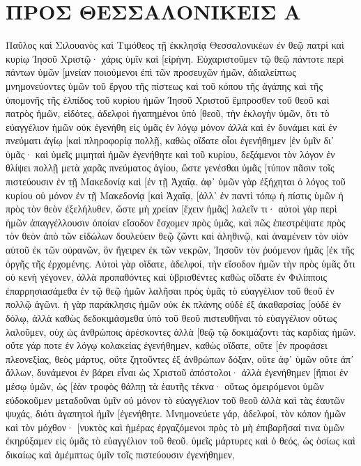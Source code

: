 \section{ΠΡΟΣ ΘΕΣΣΑΛΟΝΙΚΕΙΣ Α}
Παῦλος καὶ Σιλουανὸς καὶ Τιμόθεος τῇ ἐκκλησίᾳ Θεσσαλονικέων ἐν θεῷ πατρὶ καὶ κυρίῳ Ἰησοῦ Χριστῷ· χάρις ὑμῖν καὶ [εἰρήνη. 
Εὐχαριστοῦμεν τῷ θεῷ πάντοτε περὶ πάντων ὑμῶν [μνείαν ποιούμενοι ἐπὶ τῶν προσευχῶν ἡμῶν, ἀδιαλείπτως 
μνημονεύοντες ὑμῶν τοῦ ἔργου τῆς πίστεως καὶ τοῦ κόπου τῆς ἀγάπης καὶ τῆς ὑπομονῆς τῆς ἐλπίδος τοῦ κυρίου ἡμῶν Ἰησοῦ Χριστοῦ ἔμπροσθεν τοῦ θεοῦ καὶ πατρὸς ἡμῶν, 
εἰδότες, ἀδελφοὶ ἠγαπημένοι ὑπὸ [θεοῦ, τὴν ἐκλογὴν ὑμῶν, 
ὅτι τὸ εὐαγγέλιον ἡμῶν οὐκ ἐγενήθη εἰς ὑμᾶς ἐν λόγῳ μόνον ἀλλὰ καὶ ἐν δυνάμει καὶ ἐν πνεύματι ἁγίῳ [καὶ πληροφορίᾳ πολλῇ, καθὼς οἴδατε οἷοι ἐγενήθημεν [ἐν ὑμῖν δι᾽ ὑμᾶς· 
καὶ ὑμεῖς μιμηταὶ ἡμῶν ἐγενήθητε καὶ τοῦ κυρίου, δεξάμενοι τὸν λόγον ἐν θλίψει πολλῇ μετὰ χαρᾶς πνεύματος ἁγίου, 
ὥστε γενέσθαι ὑμᾶς [τύπον πᾶσιν τοῖς πιστεύουσιν ἐν τῇ Μακεδονίᾳ καὶ [ἐν τῇ Ἀχαΐᾳ. 
ἀφ᾽ ὑμῶν γὰρ ἐξήχηται ὁ λόγος τοῦ κυρίου οὐ μόνον ἐν τῇ Μακεδονίᾳ [καὶ Ἀχαΐᾳ, [ἀλλ᾽ ἐν παντὶ τόπῳ ἡ πίστις ὑμῶν ἡ πρὸς τὸν θεὸν ἐξελήλυθεν, ὥστε μὴ χρείαν [ἔχειν ἡμᾶς] λαλεῖν τι· 
αὐτοὶ γὰρ περὶ ἡμῶν ἀπαγγέλλουσιν ὁποίαν εἴσοδον ἔσχομεν πρὸς ὑμᾶς, καὶ πῶς ἐπεστρέψατε πρὸς τὸν θεὸν ἀπὸ τῶν εἰδώλων δουλεύειν θεῷ ζῶντι καὶ ἀληθινῷ, 
καὶ ἀναμένειν τὸν υἱὸν αὐτοῦ ἐκ τῶν οὐρανῶν, ὃν ἤγειρεν ἐκ τῶν νεκρῶν, Ἰησοῦν τὸν ῥυόμενον ἡμᾶς [ἐκ τῆς ὀργῆς τῆς ἐρχομένης. 
Αὐτοὶ γὰρ οἴδατε, ἀδελφοί, τὴν εἴσοδον ἡμῶν τὴν πρὸς ὑμᾶς ὅτι οὐ κενὴ γέγονεν, 
ἀλλὰ προπαθόντες καὶ ὑβρισθέντες καθὼς οἴδατε ἐν Φιλίπποις ἐπαρρησιασάμεθα ἐν τῷ θεῷ ἡμῶν λαλῆσαι πρὸς ὑμᾶς τὸ εὐαγγέλιον τοῦ θεοῦ ἐν πολλῷ ἀγῶνι. 
ἡ γὰρ παράκλησις ἡμῶν οὐκ ἐκ πλάνης οὐδὲ ἐξ ἀκαθαρσίας [οὐδὲ ἐν δόλῳ, 
ἀλλὰ καθὼς δεδοκιμάσμεθα ὑπὸ τοῦ θεοῦ πιστευθῆναι τὸ εὐαγγέλιον οὕτως λαλοῦμεν, οὐχ ὡς ἀνθρώποις ἀρέσκοντες ἀλλὰ [θεῷ τῷ δοκιμάζοντι τὰς καρδίας ἡμῶν. 
οὔτε γάρ ποτε ἐν λόγῳ κολακείας ἐγενήθημεν, καθὼς οἴδατε, οὔτε [ἐν προφάσει πλεονεξίας, θεὸς μάρτυς, 
οὔτε ζητοῦντες ἐξ ἀνθρώπων δόξαν, οὔτε ἀφ᾽ ὑμῶν οὔτε ἀπ᾽ ἄλλων, 
δυνάμενοι ἐν βάρει εἶναι ὡς Χριστοῦ ἀπόστολοι· ἀλλὰ ἐγενήθημεν [ἤπιοι ἐν μέσῳ ὑμῶν, ὡς [ἐὰν τροφὸς θάλπῃ τὰ ἑαυτῆς τέκνα· 
οὕτως ὁμειρόμενοι ὑμῶν εὐδοκοῦμεν μεταδοῦναι ὑμῖν οὐ μόνον τὸ εὐαγγέλιον τοῦ θεοῦ ἀλλὰ καὶ τὰς ἑαυτῶν ψυχάς, διότι ἀγαπητοὶ ἡμῖν [ἐγενήθητε. 
Μνημονεύετε γάρ, ἀδελφοί, τὸν κόπον ἡμῶν καὶ τὸν μόχθον· [νυκτὸς καὶ ἡμέρας ἐργαζόμενοι πρὸς τὸ μὴ ἐπιβαρῆσαί τινα ὑμῶν ἐκηρύξαμεν εἰς ὑμᾶς τὸ εὐαγγέλιον τοῦ θεοῦ. 
ὑμεῖς μάρτυρες καὶ ὁ θεός, ὡς ὁσίως καὶ δικαίως καὶ ἀμέμπτως ὑμῖν τοῖς πιστεύουσιν ἐγενήθημεν, 

